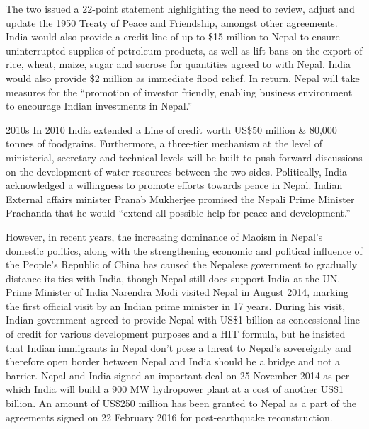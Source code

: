 \documentclass[
  openany]{book}
\begin{document}
The two issued a 22-point statement highlighting the need to review, adjust and update the 1950 Treaty of Peace and Friendship, amongst other agreements. India would also provide a credit line of up to \$15 million to Nepal to ensure uninterrupted supplies of petroleum products, as well as lift bans on the export of rice, wheat, maize, sugar and sucrose for quantities agreed to with Nepal. India would also provide \$2 million as immediate flood relief.
In return, Nepal will take measures for the ``promotion of investor friendly, enabling business environment to encourage Indian investments in Nepal.''

2010s
In 2010 India extended a Line of credit worth US\$50 million \& 80,000 tonnes of foodgrains. Furthermore, a three-tier mechanism at the level of ministerial, secretary and technical levels will be built to push forward discussions on the development of water resources between the two sides. Politically, India acknowledged a willingness to promote efforts towards peace in Nepal. Indian External affairs minister Pranab Mukherjee promised the Nepali Prime Minister Prachanda that he would ``extend all possible help for peace and development.''

However, in recent years, the increasing dominance of Maoism in Nepal's domestic politics, along with the strengthening economic and political influence of the People's Republic of China has caused the Nepalese government to gradually distance its ties with India, though Nepal still does support India at the UN. Prime Minister of India Narendra Modi visited Nepal in August 2014, marking the first official visit by an Indian prime minister in 17 years. During his visit, Indian government agreed to provide Nepal with US\$1 billion as concessional line of credit for various development purposes and a HIT formula, but he insisted that Indian immigrants in Nepal don't pose a threat to Nepal's sovereignty and therefore open border between Nepal and India should be a bridge and not a barrier. Nepal and India signed an important deal on 25 November 2014 as per which India will build a 900 MW hydropower plant at a cost of another US\$1 billion. An amount of US\$250 million has been granted to Nepal as a part of the agreements signed on 22 February 2016 for post-earthquake reconstruction.
\end{document}
